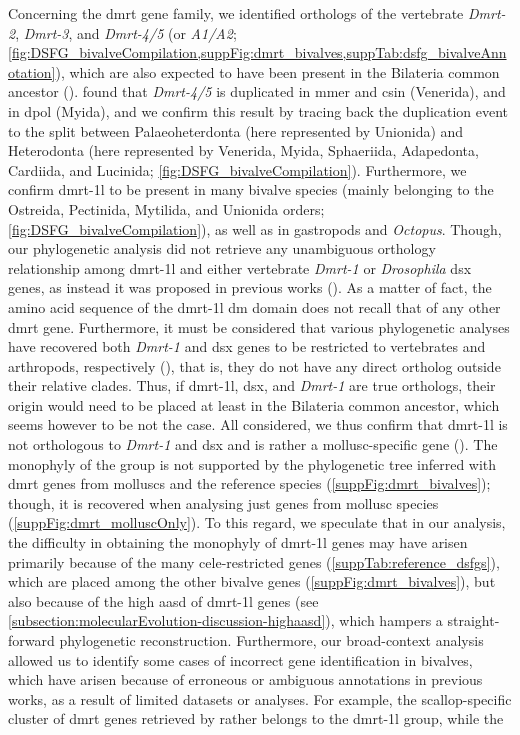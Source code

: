 Concerning the \gls{dmrt} gene family, we identified orthologs of the vertebrate \textit{Dmrt-2}, \textit{Dmrt-3}, and \textit{Dmrt-4/5} (or \textit{A1/A2}; \cref{fig:DSFG_bivalveCompilation,suppFig:dmrt_bivalves,suppTab:dsfg_bivalveAnnotation}), which are also expected to have been present in the Bilateria common ancestor ().  found that \textit{Dmrt-4/5} is duplicated in \gls{mmer} and \gls{csin} (Venerida), and in \gls{dpol} (Myida), and we confirm this result by tracing back the duplication event to the split between Palaeoheterdonta (here represented by Unionida) and Heterodonta (here represented by Venerida, Myida, Sphaeriida, Adapedonta, Cardiida, and Lucinida; \cref{fig:DSFG_bivalveCompilation}). Furthermore, we confirm \gls{dmrt-1l} to be present in many bivalve species (mainly belonging to the Ostreida, Pectinida, Mytilida, and Unionida orders; \cref{fig:DSFG_bivalveCompilation}), as well as in gastropods and \textit{Octopus}. Though, our phylogenetic analysis did not retrieve any unambiguous orthology relationship among \gls{dmrt-1l} and either vertebrate \textit{Dmrt-1} or \textit{Drosophila} \gls{dsx} genes, as instead it was proposed in previous works (). As a matter of fact, the amino acid sequence of the \gls{dmrt-1l} \gls{dm} domain does not recall that of any other \gls{dmrt} gene. Furthermore, it must be considered that various phylogenetic analyses have recovered both \textit{Dmrt-1} and \gls{dsx} genes to be restricted to vertebrates and arthropods, respectively (), that is, they do not have any direct ortholog outside their relative clades. Thus, if \gls{dmrt-1l}, \gls{dsx}, and \textit{Dmrt-1} are true orthologs, their origin would need to be placed at least in the Bilateria common ancestor, which seems however to be not the case. All considered, we thus confirm that \gls{dmrt-1l} is not orthologous to \textit{Dmrt-1} and \gls{dsx} and is rather a mollusc-specific gene (). The monophyly of the group is not supported by the phylogenetic tree inferred with \gls{dmrt} genes from molluscs and the reference species (\cref{suppFig:dmrt_bivalves}); though, it is recovered when analysing just genes from mollusc species (\cref{suppFig:dmrt_molluscOnly}). To this regard, we speculate that in our analysis, the difficulty in obtaining the monophyly of \gls{dmrt-1l} genes may have arisen primarily because of the many \gls{cele}-restricted genes (\cref{suppTab:reference_dsfgs}), which are placed among the other bivalve genes (\cref{suppFig:dmrt_bivalves}), but also because of the high \gls{aasd} of \gls{dmrt-1l} genes (see \cref{subsection:molecularEvolution-discussion-highaasd}), which hampers a straight-forward phylogenetic reconstruction. Furthermore, our broad-context analysis allowed us to identify some cases of incorrect gene identification in bivalves, which have arisen because of erroneous or ambiguous annotations in previous works, as a result of limited datasets or analyses. For example, the scallop-specific cluster of \gls{dmrt} genes retrieved by  rather belongs to the \gls{dmrt-1l} group, while the 